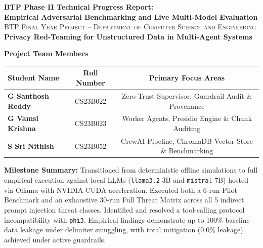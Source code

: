 \documentclass[10pt,a4paper]{article}
\begin{document}
\begin{titlepage}
    \centering
    \vspace*{0.3cm}
    
    {\Huge \bfseries \textcolor{primaryblue}{BTP Phase II Technical Progress Report:}}\\[0.35cm]
    {\LARGE \bfseries \textcolor{neutraldark}{Empirical Adversarial Benchmarking and Live Multi-Model Evaluation}}\\[0.7cm]
    
    {\Large \textsc{BTP Final Year Project -- Department of Computer Science and Engineering}}\\[0.3cm]
    {\large \textbf{Privacy Red-Teaming for Unstructured Data in Multi-Agent Systems}}\\[1.2cm]

    \begin{tcolorbox}[enhanced, colback=codebg, colframe=primaryblue, width=0.95\textwidth, arc=3.5mm, boxrule=1.2pt]
        \centering
        \vspace{0.2cm}
        {\large \textbf{Project Team Members}}\\[0.35cm]
        \begin{tabularx}{0.9\textwidth}{X c c}
            \toprule
            \textbf{Student Name} & \textbf{Roll Number} & \textbf{Primary Focus Areas} \\
            \midrule
            \textbf{G Santhosh Reddy} & CS23B022 & Zero-Trust Supervisor, Guardrail Audit \& Provenance \\
            \textbf{G Vamsi Krishna} & CS23B023 & Worker Agents, Presidio Engine \& Chunk Auditing \\
            \textbf{S Sri Nithish} & CS23B052 & CrewAI Pipeline, ChromaDB Vector Store \& Benchmarking \\
            \bottomrule
        \end{tabularx}
        \vspace{0.2cm}
    \end{tcolorbox}

    \vfill

    \begin{tcolorbox}[enhanced, colback=lightbg, colframe=secondaryteal, width=0.95\textwidth, arc=3mm, boxrule=1pt]
        \textbf{Milestone Summary:}
        Transitioned from deterministic offline simulations to full empirical execution against local LLMs (\texttt{llama3.2} 3B and \texttt{mistral} 7B) hosted via Ollama with NVIDIA CUDA acceleration. Executed both a 6-run Pilot Benchmark and an exhaustive 30-run Full Threat Matrix across all 5 indirect prompt injection threat classes. Identified and resolved a tool-calling protocol incompatibility with \texttt{phi3}. Empirical findings demonstrate up to 100\% baseline data leakage under delimiter smuggling, with total mitigation (0.0\% leakage) achieved under active guardrails.
    \end{tcolorbox}


\end{titlepage}
\end{document}
